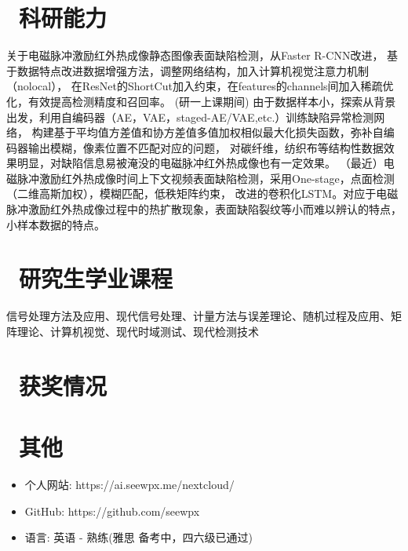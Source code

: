 \documentclass{resume}
\begin{document}
\section{\faCogs\ 科研能力}
关于电磁脉冲激励红外热成像静态图像表面缺陷检测，从Faster R-CNN改进，
基于数据特点改进数据增强方法，调整网络结构，加入计算机视觉注意力机制（nolocal），
在ResNet的ShortCut加入约束，在features的channels间加入稀疏优化，有效提高检测精度和召回率。
(研一上课期间) 由于数据样本小，探索从背景出发，利用自编码器（AE，VAE，staged-AE/VAE,etc.）训练缺陷异常检测网络，
构建基于平均值方差值和协方差值多值加权相似最大化损失函数，弥补自编码器输出模糊，像素位置不匹配对应的问题，
对碳纤维，纺织布等结构性数据效果明显，对缺陷信息易被淹没的电磁脉冲红外热成像也有一定效果。
（最近）电磁脉冲激励红外热成像时间上下文视频表面缺陷检测，采用One-stage，点面检测（二维高斯加权），模糊匹配，低秩矩阵约束，
改进的卷积化LSTM。对应于电磁脉冲激励红外热成像过程中的热扩散现象，表面缺陷裂纹等小而难以辨认的特点，小样本数据的特点。
\section{\faHeartO\ 研究生学业课程}
信号处理方法及应用、现代信号处理、计量方法与误差理论、随机过程及应用、矩阵理论、计算机视觉、现代时域测试、现代检测技术

\section{\faHeartO\ 获奖情况}

\section{\faInfo\ 其他}
\begin{itemize}[parsep=0.5ex]
  \item 个人网站: https://ai.seewpx.me/nextcloud/
  \item GitHub: https://github.com/seewpx
  \item 语言: 英语 - 熟练(雅思 备考中，四六级已通过)
\end{itemize}

%
%
\end{document}
